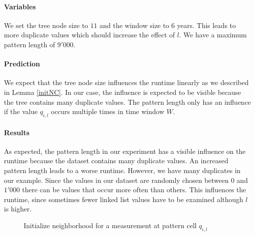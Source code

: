 \documentclass[abstracton,12pt,oneside]{scrreprt}
\begin{document}
\paragraph{Variables}
We set the tree node size to $11$ and the window size to $6$ years. This leads to more duplicate values which should increase the effect of $l$.  We have a maximum pattern length of $9'000$. 

\paragraph{Prediction}
We expect that the tree node size influences the runtime linearly as we described in Lemma \ref{initNC}. In our case, the influence is expected to be visible because the tree contains many duplicate values. The pattern length only has an influence if the value $q_{i,l}$ occurs multiple times in time window $W$.  

\paragraph{Results}
As expected, the pattern length in our experiment has a visible influence on the runtime because the dataset contains many duplicate values. An increased pattern length leads to a worse runtime. However, we have many duplicates in our example. Since the values in our dataset are randomly chosen between $0$ and $1'000$ there can be values that occur more often than others. This influences the runtime, since sometimes fewer linked list values have to be examined although $l$ is higher. 


\begin{figure}[H]
	\centering
	\caption{Initialize neighborhood for a measurement at pattern cell $q_{i,l}$ } \label{fig:l}
\end{figure}
\end{document}
